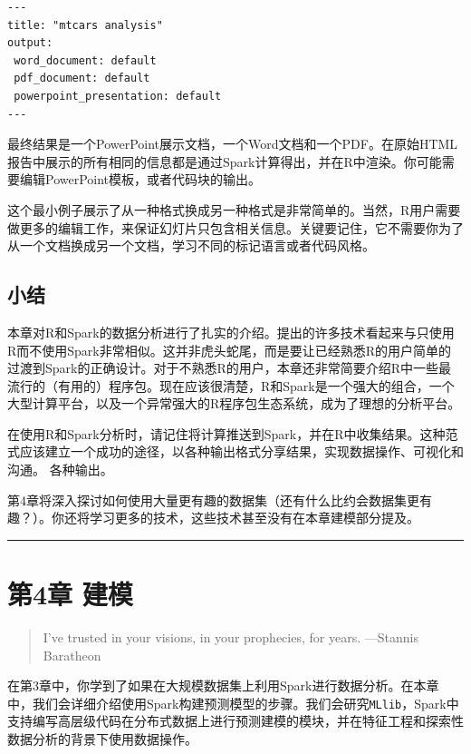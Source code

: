 \documentclass[
]{article}
\begin{document}
\begin{verbatim}
---
title: "mtcars analysis"
output:
 word_document: default
 pdf_document: default
 powerpoint_presentation: default
---
\end{verbatim}

最终结果是一个PowerPoint展示文档，一个Word文档和一个PDF。在原始HTML报告中展示的所有相同的信息都是通过Spark计算得出，并在R中渲染。你可能需要编辑PowerPoint模板，或者代码块的输出。

这个最小例子展示了从一种格式换成另一种格式是非常简单的。当然，R用户需要做更多的编辑工作，来保证幻灯片只包含相关信息。关键要记住，它不需要你为了从一个文档换成另一个文档，学习不同的标记语言或者代码风格。

\hypertarget{ux5c0fux7ed3-2}{%
\subsection{小结}\label{ux5c0fux7ed3-2}}

本章对R和Spark的数据分析进行了扎实的介绍。提出的许多技术看起来与只使用R而不使用Spark非常相似。这并非虎头蛇尾，而是要让已经熟悉R的用户简单的过渡到Spark的正确设计。对于不熟悉R的用户，本章还非常简要介绍R中一些最流行的（有用的）程序包。现在应该很清楚，R和Spark是一个强大的组合，一个大型计算平台，以及一个异常强大的R程序包生态系统，成为了理想的分析平台。

在使用R和Spark分析时，请记住将计算推送到Spark，并在R中收集结果。这种范式应该建立一个成功的途径，以各种输出格式分享结果，实现数据操作、可视化和沟通。
各种输出。

第4章将深入探讨如何使用大量更有趣的数据集（还有什么比约会数据集更有趣？）。你还将学习更多的技术，这些技术甚至没有在本章建模部分提及。

\begin{center}\rule{0.5\linewidth}{\linethickness}\end{center}

\hypertarget{ux7b2c4ux7ae0-ux5efaux6a21}{%
\section{第4章 建模}\label{ux7b2c4ux7ae0-ux5efaux6a21}}

\begin{quote}
I've trusted in your visions, in your prophecies, for years. ---Stannis
Baratheon
\end{quote}

在第3章中，你学到了如果在大规模数据集上利用Spark进行数据分析。在本章中，我们会详细介绍使用Spark构建预测模型的步骤。我们会研究\texttt{MLlib}，Spark中支持编写高层级代码在分布式数据上进行预测建模的模块，并在特征工程和探索性数据分析的背景下使用数据操作。
\end{document}
